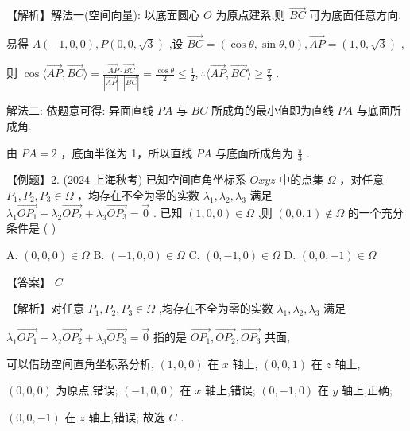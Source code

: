 \documentclass[10pt]{article}
\begin{document}
【解析】解法一(空间向量): 以底面圆心 \(O\) 为原点建系,则 \(\overrightarrow{BC}\) 可为底面任意方向,

易得 \(A\left( {-1,0,0}\right) ,P\left( {0,0,\sqrt{3}}\right)\) ,设 \(\overrightarrow{BC} = \left( {\cos \theta ,\sin \theta ,0}\right) ,\overrightarrow{AP} = \left( {1,0,\sqrt{3}}\right)\) ,

则 \(\cos \langle \overrightarrow{AP},\overrightarrow{BC}\rangle  = \frac{\overrightarrow{AP} \cdot  \overrightarrow{BC}}{\left| \overrightarrow{AP}\right|  \cdot  \left| \overrightarrow{BC}\right| } = \frac{\cos \theta }{2} \leq  \frac{1}{2},\therefore \langle \overrightarrow{AP},\overrightarrow{BC}\rangle  \geq  \frac{\pi }{3}\) .

解法二: 依题意可得: 异面直线 \({PA}\) 与 \({BC}\) 所成角的最小值即为直线 \({PA}\) 与底面所成角.

由 \({PA} = 2\) ，底面半径为 1，所以直线 \({PA}\) 与底面所成角为 \(\frac{\pi }{3}\) .

【例题】2. (2024 上海秋考) 已知空间直角坐标系 \({Oxyz}\) 中的点集 \(\Omega\) ，对任意 \({P}_{1},{P}_{2},{P}_{3} \in  \Omega\) ，均存在不全为零的实数 \({\lambda }_{1},{\lambda }_{2},{\lambda }_{3}\) 满足 \({\lambda }_{1}\overrightarrow{O{P}_{1}} + {\lambda }_{2}\overrightarrow{O{P}_{2}} + {\lambda }_{3}\overrightarrow{O{P}_{3}} = \overrightarrow{0}\) . 已知 \(\left( {1,0,0}\right)  \in  \Omega\) ,则 \(\left( {0,0,1}\right)  \notin  \Omega\) 的一个充分条件是 ( )

A. \(\left( {0,0,0}\right)  \in  \Omega\) B. \(\left( {-1,0,0}\right)  \in  \Omega\) C. \(\left( {0, - 1,0}\right)  \in  \Omega\) D. \(\left( {0,0, - 1}\right)  \in  \Omega\)

【答案】 \(C\)

【解析】对任意 \({P}_{1},{P}_{2},{P}_{3} \in  \Omega\) ,均存在不全为零的实数 \({\lambda }_{1},{\lambda }_{2},{\lambda }_{3}\) 满足

\({\lambda }_{1}\overrightarrow{O{P}_{1}} + {\lambda }_{2}\overrightarrow{O{P}_{2}} + {\lambda }_{3}\overrightarrow{O{P}_{3}} = \overrightarrow{0}\) 指的是 \(\overrightarrow{O{P}_{1}},\overrightarrow{O{P}_{2}},\overrightarrow{O{P}_{3}}\) 共面,

可以借助空间直角坐标系分析, \(\left( {1,0,0}\right)\) 在 \(x\) 轴上, \(\left( {0,0,1}\right)\) 在 \(z\) 轴上,

\(\left( {0,0,0}\right)\) 为原点,错误; \(\left( {-1,0,0}\right)\) 在 \(x\) 轴上,错误; \(\left( {0, - 1,0}\right)\) 在 \(y\) 轴上,正确;

\(\left( {0,0, - 1}\right)\) 在 \(z\) 轴上,错误; 故选 \(C\) .
\end{document}
